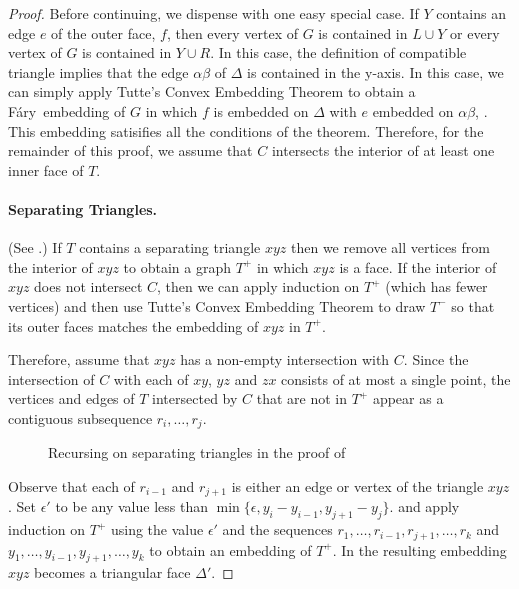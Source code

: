 \documentclass{patmorin}
\newcommand{\Fary}{Fáry}
\begin{document}
\begin{proof}
   Before continuing, we dispense with one easy special case.  If $Y$
   contains an edge $e$ of the outer face, $f$, then every vertex
   of $G$ is contained in $L\cup Y$ or every vertex of $G$ is contained
   in $Y\cup R$.  In this case, the definition of compatible triangle
   implies that the edge $\alpha\beta$ of $\Delta$ is contained in the
   y-axis.  In this case, we can simply apply Tutte's Convex Embedding
   Theorem to obtain a \Fary\ embedding of $G$ in which $f$ is embedded
   on $\Delta$ with $e$ embedded on $\alpha\beta$, .  This embedding
   satisifies all the conditions of the theorem.  Therefore, for the
   remainder of this proof, we assume that $C$ intersects the interior
   of at least one inner face of $T$.

   \paragraph{Separating Triangles.}
   (See .)
   If $T$ contains a separating triangle $xyz$ then we remove all vertices
   from the interior of $xyz$ to obtain a graph $T^+$ in which $xyz$
   is a face.  If the interior of $xyz$ does not intersect $C$, then
   we can apply induction on $T^+$ (which has fewer vertices) and then
   use Tutte's Convex Embedding Theorem to draw $T^-$ so that its outer
   faces matches the embedding of $xyz$ in $T^+$.

   Therefore, assume that $xyz$ has a non-empty intersection with $C$.
   Since the intersection of $C$ with each of $xy$, $yz$ and $zx$
   consists of at most a single point, the vertices and edges of $T$
   intersected by $C$ that are not in $T^+$ appear as a contiguous
   subsequence $r_i,\ldots,r_j$.

   \begin{figure}
      \caption{Recursing on separating triangles in the proof of
      }
   \end{figure}

   Observe that each of $r_{i-1}$ and $r_{j+1}$ is either an edge
   or vertex of the triangle $xyz$.  Set $\epsilon'$ to be any
   value less than $\min\{\epsilon,y_{i}-y_{i-1}, y_{j+1}-y_j\}$.
   and apply induction on $T^+$ using the value $\epsilon'$
   and the sequences $r_1,\ldots,r_{i-1},r_{j+1},\ldots,r_k$ and
   $y_1,\ldots,y_{i-1},y_{j+1},\ldots,y_k$ to obtain an embedding
   of $T^+$.  In the resulting embedding $xyz$ becomes a triangular face
   $\Delta'$.


\end{proof}
\end{document}
